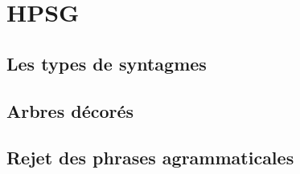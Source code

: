 %
\section{HPSG}

\subsection{Les types de syntagmes}




\subsection{Arbres décorés}

\subsection{Rejet des phrases agrammaticales}

